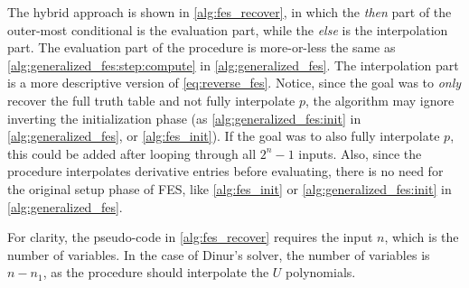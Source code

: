 The hybrid approach is shown in \cref{alg:fes_recover}, in which the \textit{then} part of the outer-most conditional is the evaluation part, while the \textit{else} is the interpolation part. The evaluation part of the procedure is more-or-less the same as \cref{alg:generalized_fes:step:compute} in \cref{alg:generalized_fes}. The interpolation part is a more descriptive version of \cref{eq:reverse_fes}. Notice, since the goal was to \textit{only} recover the full truth table and not fully interpolate $p$, the algorithm may ignore inverting the initialization phase (as \cref{alg:generalized_fes:init} in \cref{alg:generalized_fes}, or \cref{alg:fes_init}). If the goal was to also fully interpolate $p$, this could be added after looping through all $2^n - 1$ inputs. Also, since the procedure interpolates derivative entries before evaluating, there is no need for the original setup phase of FES, like \cref{alg:fes_init} or \cref{alg:generalized_fes:init} in \cref{alg:generalized_fes}. 

For clarity, the pseudo-code in \cref{alg:fes_recover} requires the input $n$, which is the number of variables. In the case of Dinur's solver, the number of variables is $n - n_1$, as the procedure should interpolate the $U$ polynomials.


\newpage
